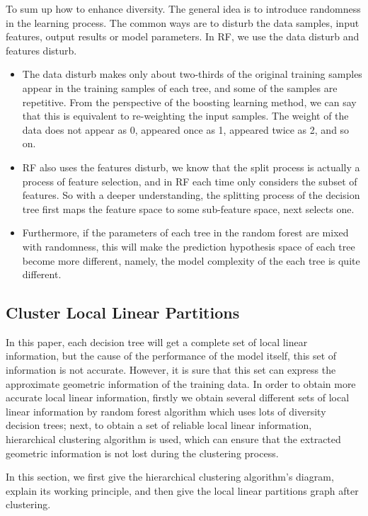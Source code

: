 \documentclass[master]{IPSstyle}
\begin{document}
{To sum up how to enhance diversity. The general idea is to introduce randomness in the learning process. The common ways are to disturb the data samples, input features, output results or model parameters. In RF, we use the data disturb and features disturb. 
\begin{itemize}
\item The data disturb makes only about two-thirds of the original training samples appear in the training samples of each tree, and some of the samples are repetitive. From the perspective of the boosting learning method, we can say that this is equivalent to re-weighting the input samples. The weight of the data does not appear as 0, appeared once as 1, appeared twice as 2, and so on.
\item RF also uses the features disturb, we know that the split process is actually a process of feature selection, and in RF each time only considers the subset of features. So with a deeper understanding, the splitting process of the decision tree first maps the feature space to some sub-feature space, next selects one.
\item Furthermore, if the parameters of each tree in the random forest are mixed with randomness, this will make the prediction hypothesis space of each tree become more different, namely, the model complexity of the each tree is quite different.
\end{itemize}

\subsection{Cluster Local Linear Partitions}
In this paper, each decision tree will get a complete set of local linear information, but the cause of the performance of the model itself, this set of information is not accurate. However, it is sure that this set can express the approximate geometric information of the training data. In order to obtain more accurate local linear information, firstly we obtain several different sets of local linear information by random forest algorithm which uses lots of diversity decision trees; next, to obtain a set of reliable local linear information, hierarchical clustering algorithm is used, which can ensure that the extracted geometric information is not lost during the clustering process.

In this section, we first give the hierarchical clustering algorithm's diagram, explain its working principle, and then give the local linear partitions graph after clustering.

}
\end{document}
